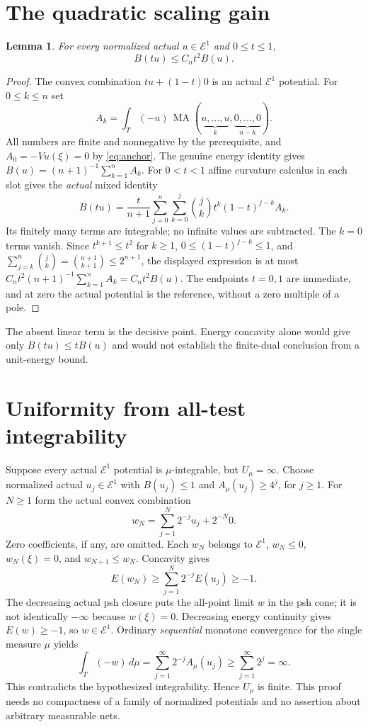 \documentclass[11pt]{article}
\newtheorem{lemma}[theorem]{Lemma}
\newcommand{\MA}{\operatorname{MA}}
\newcommand{\E}{\mathcal E}
\begin{document}
\section{The quadratic scaling gain}

\begin{lemma}\label{lem:scaling}
For every normalized actual $u\in\E^1$ and $0\leq t\leq1$,
\[
                         B(tu)\leq C_nt^2B(u).
\]
\end{lemma}
\begin{proof}
The convex combination $tu+(1-t)0$ is an actual $\E^1$ potential.
For $0\leq k\leq n$ set
\[
 A_k=\int_T(-u)\,\MA(\underbrace{u,\ldots,u}_{k},
                           \underbrace{0,\ldots,0}_{n-k}).
\]
All numbers are finite and nonnegative by the prerequisite, and
$A_0=-Vu(\xi)=0$ by \eqref{eq:anchor}. The genuine energy identity
gives $B(u)=(n+1)^{-1}\sum_{k=1}^nA_k$.
For $0<t<1$ affine curvature calculus in each slot gives the
\emph{actual} mixed identity
\[
 B(tu)=\frac{t}{n+1}\sum_{j=0}^n\sum_{k=0}^j
       \binom{j}{k}t^k(1-t)^{j-k}A_k.
\]
Its finitely many terms are integrable; no infinite values are
subtracted. The $k=0$ terms vanish. Since $t^{k+1}\leq t^2$ for
$k\geq1$, $0\leq(1-t)^{j-k}\leq1$, and
$\sum_{j=k}^n\binom{j}{k}=\binom{n+1}{k+1}\leq2^{n+1}$,
the displayed expression is at most
$C_nt^2(n+1)^{-1}\sum_{k=1}^nA_k=C_nt^2B(u)$.
The endpoints $t=0,1$ are immediate, and at zero the actual
potential is the reference, without a zero multiple of a pole.
\end{proof}

The absent linear term is the decisive point. Energy concavity
alone would give only $B(tu)\leq tB(u)$ and would not establish the
finite-dual conclusion from a unit-energy bound.

\section{Uniformity from all-test integrability}

Suppose every actual $\E^1$ potential is $\mu$-integrable, but
$U_\mu=\infty$. Choose normalized actual $u_j\in\E^1$ with
$B(u_j)\leq1$ and $A_\mu(u_j)\geq4^j$, for $j\geq1$.
For $N\geq1$ form the actual convex combination
\[
 w_N=\sum_{j=1}^N2^{-j}u_j+2^{-N}0.
\]
Zero coefficients, if any, are omitted. Each $w_N$ belongs to
$\E^1$, $w_N\leq0$, $w_N(\xi)=0$, and $w_{N+1}\leq w_N$.
Concavity gives
\[
                 E(w_N)\geq\sum_{j=1}^N2^{-j}E(u_j)\geq-1.
\]
The decreasing actual psh closure puts the all-point limit $w$
in the psh cone; it is not identically $-\infty$ because
$w(\xi)=0$. Decreasing energy continuity gives $E(w)\geq-1$,
so $w\in\E^1$. Ordinary \emph{sequential} monotone convergence
for the single measure $\mu$ yields
\[
 \int_T(-w)\,d\mu
   =\sum_{j=1}^\infty2^{-j}A_\mu(u_j)
   \geq\sum_{j=1}^\infty2^j=\infty.
\]
This contradicts the hypothesized integrability. Hence $U_\mu$ is
finite. This proof needs no compactness of a family of normalized
potentials and no assertion about arbitrary measurable nets.
\end{document}
